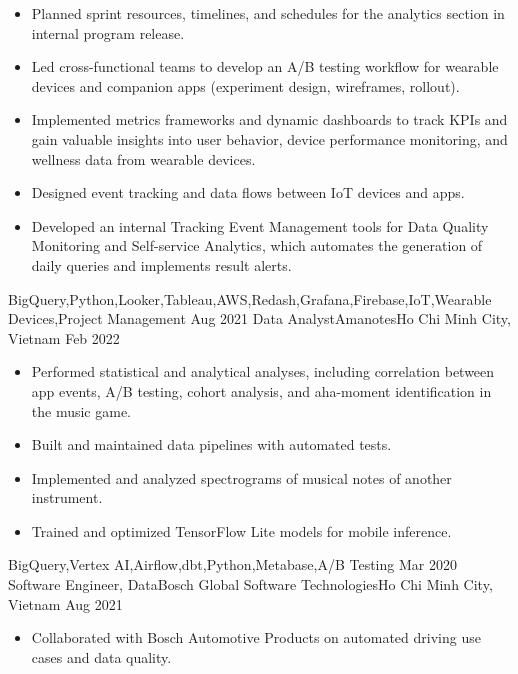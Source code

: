 \begin{experiences}
{\begin{itemize}
                        \item Planned sprint resources, timelines, and schedules for the analytics section in internal program release.
                        \item Led cross-functional teams to develop an A/B testing workflow for wearable devices and companion apps (experiment design, wireframes, rollout).
                        \item Implemented metrics frameworks and dynamic dashboards to track KPIs and gain valuable insights into user behavior, device performance monitoring, and wellness data from wearable devices.
                        \item Designed event tracking and data flows between IoT devices and apps.
                        \item Developed an internal Tracking Event Management tools for Data Quality Monitoring and Self-service Analytics, which automates the generation of daily queries and implements result alerts.
                      \end{itemize}
                    }
                    {BigQuery,Python,Looker,Tableau,AWS,Redash,Grafana,Firebase,IoT,Wearable Devices,Project Management}
  \emptySeparator
  \experience
    {Aug 2021}     {Data Analyst}{Amanotes}{Ho Chi Minh City, Vietnam}
    {Feb 2022}    {
                      \begin{itemize}
                          \item Performed statistical and analytical analyses, including correlation between app events, A/B testing, cohort analysis, and aha-moment identification in the music game.
                          \item Built and maintained data pipelines with automated tests.
                          \item Implemented and analyzed spectrograms of musical notes of another instrument.
                          \item Trained and optimized TensorFlow Lite models for mobile inference.
                      \end{itemize}
                    }
                    {BigQuery,Vertex AI,Airflow,dbt,Python,Metabase,A/B Testing} 
  \emptySeparator
  \experience
  {Mar 2020}  {Software Engineer, Data}{Bosch Global Software Technologies}{Ho Chi Minh City, Vietnam}
  {Aug 2021}   {
                      \begin{itemize}
                          \item Collaborated with Bosch Automotive Products on automated driving use cases and data quality.

\end{itemize}}
\end{experiences}
